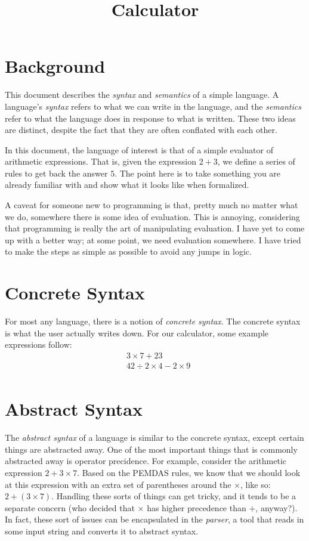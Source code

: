 \documentclass[nocopyrightspace]{sigplanconf}
\begin{document}
\title{Calculator}
\authorinfo{}{}{}
\date{}
\maketitle

\section{Background}
This document describes the \emph{syntax} and \emph{semantics} of a simple language.
A language's \emph{syntax} refers to what we can write in the language, and the \emph{semantics} refer to what the language does in response to what is written.
These two ideas are distinct, despite the fact that they are often conflated with each other.

In this document, the language of interest is that of a simple evaluator of arithmetic expressions.
That is, given the expression $2 + 3$, we define a series of rules to get back the answer $5$.
The point here is to take something you are already familiar with and show what it looks like when formalized.

A caveat for someone new to programming is that, pretty much no matter what we do, somewhere there is some idea of evaluation.
This is annoying, considering that programming is really the art of manipulating evaluation.
I have yet to come up with a better way; at some point, we need evaluation somewhere.
I have tried to make the steps as simple as possible to avoid any jumps in logic.

\section{Concrete Syntax}
For most any language, there is a notion of \emph{concrete syntax}.
The concrete syntax is what the user actually writes down.
For our calculator, some example expressions follow:
\begin{align*}
  &3 \times 7 + 23\\
  &42 \div  2 \times 4 - 2 \times 9\\
\end{align*}

\section{Abstract Syntax}
The \emph{abstract syntax} of a language is similar to the concrete syntax, except certain things are abstracted away.
One of the most important things that is commonly abstracted away is operator precidence.
For example, consider the arithmetic expression $2 + 3 \times 7$.
Based on the PEMDAS rules, we know that we should look at this expression with an extra set of parentheses around the $\times$, like so: $2 + (3 \times 7)$.
Handling these sorts of things can get tricky, and it tends to be a separate concern (who decided that $\times$ has higher precedence than $+$, anyway?).
In fact, these sort of issues can be encapsulated in the \emph{parser}, a tool that reads in some input string and converts it to abstract syntax.
\end{document}
